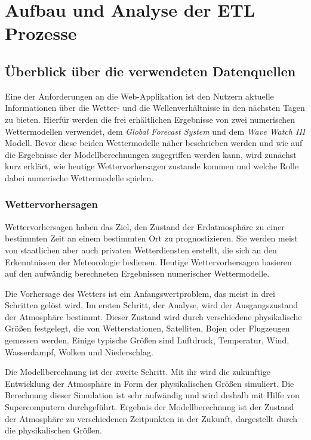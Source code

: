 
\chapter{Aufbau und Analyse der ETL Prozesse}

\section{Überblick über die verwendeten Datenquellen}
Eine der Anforderungen an die Web-Applikation ist den Nutzern aktuelle
Informationen über die Wetter- und die Wellenverhältnisse in den
nächsten Tagen zu bieten. Hierfür werden die frei erhältlichen
Ergebnisse von zwei numerischen Wettermodellen verwendet, dem
\textit{Global Forecast System} und dem \textit{Wave Watch III}
Modell. Bevor diese beiden Wettermodelle näher beschrieben werden und
wie auf die Ergebnisse der Modellberechnungen zugegriffen werden kann,
wird zunächst kurz erklärt, wie heutige Wettervorhersagen zustande
kommen und welche Rolle dabei numerische Wettermodelle spielen.

\subsection{Wettervorhersagen}
Wettervorhersagen haben das Ziel, den Zustand der Erdatmosphäre zu
einer bestimmten Zeit an einem bestimmten Ort zu prognostizieren. Sie
werden meist von staatlichen aber auch privaten Wetterdiensten
erstellt, die sich an den Erkenntnissen der Meteorologie
bedienen. Heutige Wettervorhersagen basieren auf den aufwändig
berechneten Ergebnissen numerischer Wettermodelle.

Die Vorhersage des Wetters ist ein Anfangswertproblem, das meist in
drei Schritten gelöst wird. Im ersten Schritt, der Analyse, wird der
Ausgangszustand der Atmosphäre bestimmt. Dieser Zustand wird durch
verschiedene physikalische Größen festgelegt, die von Wetterstationen,
Satelliten, Bojen oder Flugzeugen gemessen werden. Einige typische
Größen sind Luftdruck, Temperatur, Wind, Wasserdampf, Wolken und
Niederschlag.

Die Modellberechnung ist der zweite Schritt. Mit ihr wird die
zukünftige Entwicklung der Atmosphäre in Form der physikalischen
Größen simuliert. Die Berechnung dieser Simulation ist sehr aufwändig
und wird deshalb mit Hilfe von Supercomputern durchgeführt. Ergebnis
der Modellberechnung ist der Zustand der Atmosphäre zu verschiedenen
Zeitpunkten in der Zukunft, dargestellt durch die physikalischen
Größen.

